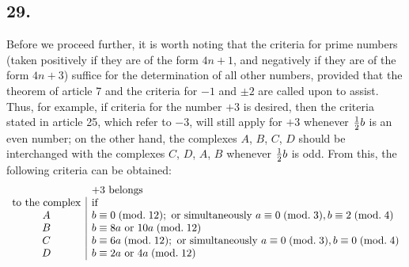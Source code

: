 \documentclass[twoside,12pt]{memoir}
\renewcommand{\pmod}[1]{\;(\textrm{mod.}\;#1)}
\let\oldfrac\frac
\def\frac#1#2{\mathchoice{\tfrac{#1}{#2}}{\oldfrac{#1}{#2}}{\genfrac{}{}{}{2}{#1}{#2\mathstrut}}{\genfrac{}{}{}{3}{#1}{#2\mathstrut}}}
\begin{document}
\subsection*{29.}
Before we proceed further, it is worth noting that the criteria for prime numbers (taken positively if they are of the form \(4n+1\), and negatively if they are of the form \(4n+3\)) suffice for the determination of all other numbers, provided that the theorem of article 7 and the criteria for \(-1\) and \(\pm 2\) are called upon to assist. Thus, for example, if criteria for the number \(+3\) is desired, then the criteria stated in article 25, which refer to \(-3\), will still apply for \(+3\) whenever \(\frac{1}{2}b\) is an even number; on the other hand, the complexes \(A\), \(B\), \(C\), \(D\) should be interchanged with the complexes \(C\), \(D\), \(A\), \(B\) whenever \(\frac{1}{2}b\) is odd. From this, the following criteria can be obtained:\pagebreak%
\[\begin{array}{c|l}
\multicolumn{1}{c}{}&\multicolumn{1}{l}{+3\text{ belongs}}\\
\text{to the complex}&\text{if}\\
A & b \equiv 0\pmod{12}; \text{ or simultaneously } a \equiv 0\pmod{3}, b \equiv 2\pmod{4} \\
B & b \equiv 8 a \text{ or } 10 a\pmod{12} \\
C & b \equiv 6 a\pmod{12}; \text{ or simultaneously } a \equiv 0\pmod{3}, b \equiv 0\pmod{4} \\
D & b \equiv 2 a \text{ or } 4 a\pmod{12}
\end{array}\]
\end{document}
